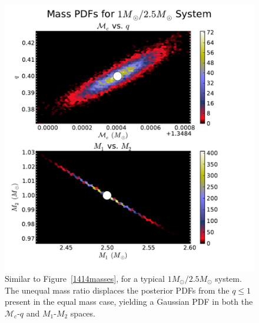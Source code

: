 \documentclass[11pt,a4paper]{emulateapj}
\begin{document}
\begin{figure}[h!]
  \centering
 \includegraphics[trim=0cm 0cm 2cm 0cm, clip=false,scale=0.56]{125masses2D.pdf}
 \caption{Similar to Figure~\ref{1414masses}, for a typical $1M_{\odot}/2.5M_{\odot}$ system.  The unequal mass ratio displaces the posterior PDFs from the $q \leq 1$ present in the equal mass case, yielding a Gaussian PDF in both the $\mathcal{M}_c$-$q$ and $M_1$-$M_2$ spaces.}
  \label{125masses}
\end{figure}
\end{document}
